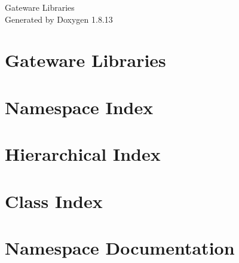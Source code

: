 \documentclass[twoside]{book}
\newcommand{\+}{\discretionary{\mbox{\scriptsize$\hookleftarrow$}}{}{}}
\newcommand{\clearemptydoublepage}{%
  \newpage{\pagestyle{empty}\cleardoublepage}%
}
\begin{document}
\hypersetup{pageanchor=false,
             bookmarksnumbered=true,
             pdfencoding=unicode
            }
\begin{titlepage}
\vspace*{7cm}
\begin{center}%
{\Large Gateware Libraries }\\
\vspace*{1cm}
{\large Generated by Doxygen 1.8.13}\\
\end{center}
\end{titlepage}
\clearemptydoublepage
{}
\tableofcontents
\clearemptydoublepage
{}
\hypersetup{pageanchor=true}

\chapter{Gateware Libraries}
\label{index}\hypertarget{index}{}
\chapter{Namespace Index}

\chapter{Hierarchical Index}

\chapter{Class Index}

\chapter{Namespace Documentation}






\end{document}
